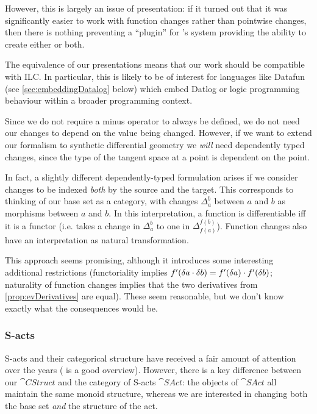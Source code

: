 However, this is largely an issue of presentation: if it turned out that it was
significantly easier to work with function changes rather than pointwise
changes, then there is nothing preventing a ``plugin'' for \citeauthor{cai2014changes}'s system providing the
ability to create either or both.

The equivalence of our presentations means that our work should be compatible
with ILC. In particular, this is likely to be of interest for languages like
Datafun (see \cref{sec:embeddingDatalog} below) which embed Datlog or logic programming behaviour within a broader
programming context.

Since we do not require a minus operator to always be defined, we do not need
our changes to depend on the value being changed. However,
if we want to extend our formalism to synthetic differential geometry we \emph{will} need
dependently typed changes, since the type of the tangent space at a point is
dependent on the point.

In fact, a slightly different dependently-typed formulation arises if we consider changes
to be indexed \emph{both} by the source and the target. This corresponds to
thinking of our base set as a category, with changes $\Delta_a^b$ between $a$
and $b$ as morphisms between $a$ and $b$. In this interpretation, a function is
differentiable iff it is a functor (i.e. takes a change in $\Delta_a^b$ to one in
$\Delta_{f(a)}^{f(b)}$). Function changes also have an interpretation as natural
transformation.

This approach seems promising, although it introduces some
interesting additional restrictions (functoriality implies $f'(\delta a \cdot \delta b) =
f'(\delta a) \cdot f'(\delta b)$; naturality of function
changes implies that
the two derivatives from \cref{prop:evDerivatives} are equal). These seem
reasonable, but we don't know exactly what the consequences would be.

\subsubsection{S-acts}

S-acts and their categorical structure have received a fair amount of attention
over the years (\textcite{kilp2000monoids} is a good
overview). However, there is a key difference between our $\cat{CStruct}$ and the category of
S-acts $\cat{SAct}$: the objects of $\cat{SAct}$ all maintain the same monoid
structure, whereas we are interested in changing both the base set \emph{and} the structure of the act.

